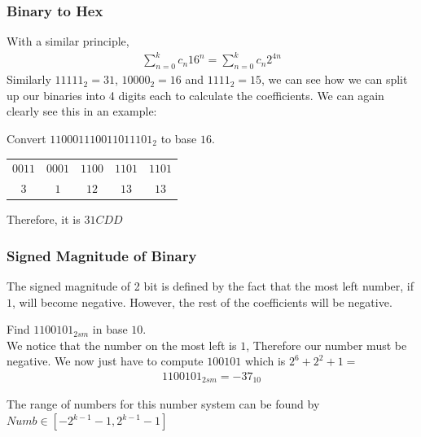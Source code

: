 \documentclass[a4paper]{article}
\theoremstyle{plain}
\theoremstyle{definition}
\newtheorem{exmp}{Example}[section]
\theoremstyle{remark}
\begin{document}
\subsubsection{Binary to Hex}
With a similar principle,
\begin{align*}
	\sum_{n=0}^{k} c_n 16^n = \sum_{n=0}^{k} c_n 2^{4n}
\end{align*}
Similarly $11111_2=31$, $10000_2=16$ and $1111_2=15$, we can see how we can split up our binaries into 4 digits each to calculate the coefficients. We can again clearly see this in an example:
\begin{tcolorbox}[colback=black!3!white,colframe=black!60!white,title=\begin{exmp}Conversion 2\label{Conversion 2}\end{exmp}]
        Convert $110001110011011101_2$ to base $16$.
	\begin{table}[H]
		\centering
		\label{tab:conversion2}
		\begin{tabular}{c|c|c|c|c}
		$0011$ & $0001$& $1100$ & $1101$ & $1101$ \\
		$3$ & $1$ & $12$ & $13$ & $13$
		\end{tabular}
	\end{table}
	Therefore, it is $31CDD$
\end{tcolorbox}
\subsubsection{Signed Magnitude of Binary}
The signed magnitude of 2 bit is defined by the fact that the most left number, if $1$, will become negative. However, the rest of the coefficients will be negative.
\begin{tcolorbox}[colback=black!3!white,colframe=black!60!white,title=\begin{exmp}Signed Magnitude \label{Signed Magnitude}\end{exmp}]
Find $1100101_{2sm}$ in base $10$.\\

We notice that the number on the most left is $1$, Therefore our number must be negative. We now just have to compute $100101$ which is $2^6+2^2+1=$
                \begin{align}
			1100101_{2sm}=-37_{10}
                \end{align}
\end{tcolorbox}
The range of numbers for this number system can be found by $Numb \in [-2^{k-1}-1,2^{k-1}-1]$
\end{document}

